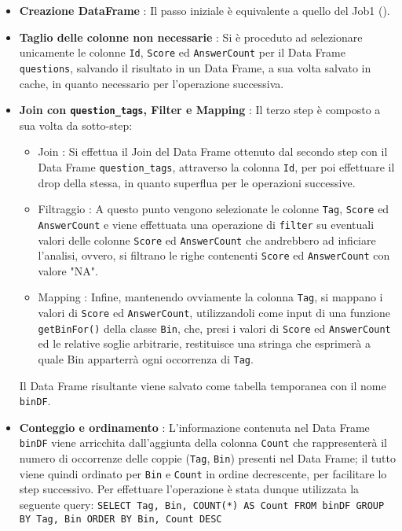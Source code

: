   \begin{itemize}
    \item \textbf{Creazione DataFrame} : Il passo iniziale è equivalente a quello del Job1
    ().
    \item \textbf{Taglio delle colonne non necessarie} : Si è proceduto ad selezionare unicamente le colonne \texttt{Id},
    \texttt{Score} ed \texttt{AnswerCount} per il Data Frame \texttt{questions}, salvando il risultato in un Data Frame,
    a sua volta salvato in cache, in quanto necessario per l'operazione successiva.
    \item \textbf{Join con \texttt{question\_tags}, Filter e Mapping} : Il terzo step è composto a sua volta da sotto-step:
    \begin{itemize}
      \item Join : Si effettua il Join del Data Frame ottenuto dal secondo step con il Data Frame \texttt{question\_tags}, attraverso
      la colonna \texttt{Id}, per poi effettuare il drop della stessa, in quanto superflua per le operazioni successive.
      \item Filtraggio : A questo punto vengono selezionate le colonne \texttt{Tag}, \texttt{Score} ed \texttt{AnswerCount}
      e viene effettuata una operazione di \texttt{filter} su eventuali valori delle colonne \texttt{Score} ed \texttt{AnswerCount}
      che andrebbero ad inficiare l'analisi, ovvero, si filtrano le righe contenenti \texttt{Score} ed \texttt{AnswerCount} con valore
      "NA".
      \item Mapping : Infine, mantenendo ovviamente la colonna \texttt{Tag},
      si mappano i valori di \texttt{Score} ed \texttt{AnswerCount}, utilizzandoli come input di una funzione
      \texttt{getBinFor()} della classe \texttt{Bin}, che, presi i valori di \texttt{Score} ed \texttt{AnswerCount} ed le relative
      soglie arbitrarie, restituisce una stringa che esprimerà a quale Bin apparterrà ogni occorrenza di \texttt{Tag}.
    \end{itemize}
    Il Data Frame risultante viene salvato come tabella temporanea con il nome \texttt{binDF}.
    \item \textbf{Conteggio e ordinamento} : L'informazione contenuta nel Data Frame \texttt{binDF} viene arricchita dall'aggiunta
    della colonna \texttt{Count} che rappresenterà il numero di occorrenze delle coppie (\texttt{Tag}, \texttt{Bin}) presenti
    nel Data Frame; il tutto viene quindi ordinato per \texttt{Bin} e \texttt{Count} in ordine decrescente, per facilitare lo step
    successivo.
    Per effettuare l'operazione è stata dunque utilizzata la seguente query:
    \texttt{SELECT Tag, Bin, COUNT(*) AS Count FROM binDF GROUP BY Tag, Bin ORDER BY Bin, Count DESC}


\end{itemize}

